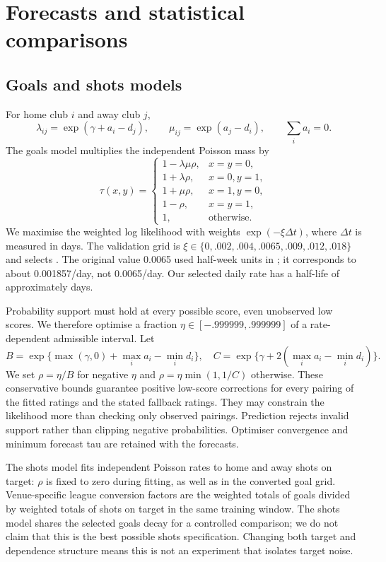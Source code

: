 \documentclass[11pt]{article}
\begin{document}
\section{Forecasts and statistical comparisons}
\subsection{Goals and shots models}
For home club $i$ and away club $j$,
\[
 \lambda_{ij}=\exp(\gamma+a_i-d_j),\qquad
 \mu_{ij}=\exp(a_j-d_i),\qquad \sum_i a_i=0.
\]
The goals model multiplies the independent Poisson mass by
\[
\tau(x,y)=
\begin{cases}
1-\lambda\mu\rho,&x=y=0,\\
1+\lambda\rho,&x=0,y=1,\\
1+\mu\rho,&x=1,y=0,\\
1-\rho,&x=y=1,\\
1,&\text{otherwise}.
\end{cases}
\]
We maximise the weighted log likelihood with weights $\exp(-\xi\Delta t)$,
where $\Delta t$ is measured in days. The validation grid is
$\xi\in\{0,.002,.004,.0065,.009,.012,.018\}$ and selects \SelectedDecay{}.
The original value 0.0065 used half-week units in \citet{dc};
it corresponds to about 0.001857/day, not 0.0065/day. Our selected daily
rate has a half-life of approximately \HalfLife{} days.

Probability support must hold at every possible score, even unobserved low
scores. We therefore optimise a fraction $\eta\in[-.999999,.999999]$ of a
rate-dependent admissible interval. Let
\[
 B=\exp\{\max(\gamma,0)+\max_i a_i-\min_i d_i\},\quad
 C=\exp\{\gamma+2(\max_i a_i-\min_i d_i)\}.
\]
We set $\rho=\eta/B$ for negative $\eta$ and
$\rho=\eta\min(1,1/C)$ otherwise. These conservative bounds guarantee positive
low-score corrections for every pairing of the fitted ratings and the stated
fallback ratings. They may constrain the likelihood more than checking only
observed pairings. Prediction rejects invalid support rather than clipping
negative probabilities. Optimiser convergence and minimum forecast tau are
retained with the forecasts.

The shots model fits independent Poisson rates to home and away shots on target:
$\rho$ is fixed to zero during fitting, as well as in the converted goal grid.
Venue-specific league conversion factors are the weighted totals of goals
divided by weighted totals of shots on target in the same training window.
The shots model shares the selected goals decay for a controlled comparison;
we do not claim that this is the best possible shots specification.
Changing both target and dependence structure means this is not an experiment
that isolates target noise.
\end{document}
